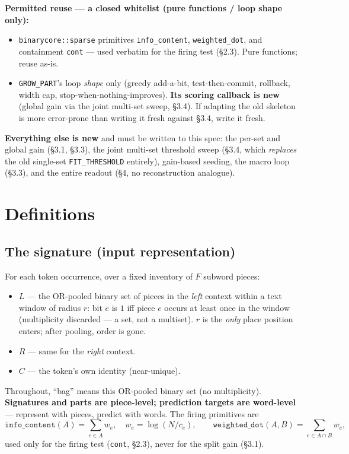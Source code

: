 \documentclass[11pt]{article}
\newcommand{\code}[1]{\texttt{#1}}
\newcommand{\cont}{\code{cont}}
\begin{document}
\noindent\textbf{Permitted reuse --- a closed whitelist (pure functions / loop shape only):}
\begin{itemize}[nosep]
\item \code{binarycore::sparse} primitives \code{info\_content}, \code{weighted\_dot}, and containment \cont{} --- used verbatim for the firing test (\S2.3). Pure functions; reuse as-is.
\item \code{GROW\_PART}'s loop \emph{shape} only (greedy add-a-bit, test-then-commit, rollback, width cap, stop-when-nothing-improves). \textbf{Its scoring callback is new} (global gain via the joint multi-set sweep, \S3.4). If adapting the old skeleton is more error-prone than writing it fresh against \S3.4, write it fresh.
\end{itemize}
\textbf{Everything else is new} and must be written to this spec: the per-set and global gain (\S3.1, \S3.3), the joint multi-set threshold sweep (\S3.4, which \emph{replaces} the old single-set \code{FIT\_THRESHOLD} entirely), gain-based seeding, the macro loop (\S3.3), and the entire readout (\S4, no reconstruction analogue).


\section{Definitions}

\subsection{The signature (input representation)}
For each token occurrence, over a fixed inventory of $F$ subword pieces:
\begin{itemize}[nosep]
\item \textbf{$L$} --- the OR-pooled binary set of pieces in the \emph{left} context within a text window of radius $r$: bit $e$ is $1$ iff piece $e$ occurs at least once in the window (multiplicity discarded --- a set, not a multiset). $r$ is the \emph{only} place position enters; after pooling, order is gone.
\item \textbf{$R$} --- same for the \emph{right} context.
\item \textbf{$C$} --- the token's own identity (near-unique).
\end{itemize}
Throughout, ``bag'' means this OR-pooled binary set (no multiplicity). \textbf{Signatures and parts are piece-level; prediction targets are word-level} --- represent with pieces, predict with words. The firing primitives are
\[
\code{info\_content}(A)=\!\sum_{e\in A}\! w_e,\quad w_e=\log(N/c_e),\qquad
\code{weighted\_dot}(A,B)=\!\!\sum_{e\in A\cap B}\!\! w_e,
\]
used only for the firing test (\cont, \S2.3), never for the split gain (\S3.1).
\end{document}
